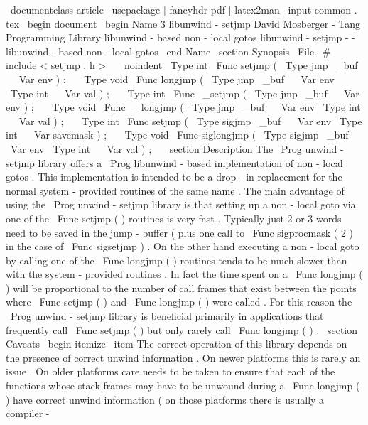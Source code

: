 \
documentclass
{
article
}
\
usepackage
[
fancyhdr
pdf
]
{
latex2man
}
\
input
{
common
.
tex
}
\
begin
{
document
}
\
begin
{
Name
}
{
3
}
{
libunwind
-
setjmp
}
{
David
Mosberger
-
Tang
}
{
Programming
Library
}
{
libunwind
-
based
non
-
local
gotos
}
libunwind
-
setjmp
-
-
libunwind
-
based
non
-
local
gotos
\
end
{
Name
}
\
section
{
Synopsis
}
\
File
{
\
#
include
<
setjmp
.
h
>
}
\
\
\
noindent
\
Type
{
int
}
\
Func
{
setjmp
}
(
\
Type
{
jmp
\
_buf
}
~
\
Var
{
env
}
)
;
\
\
\
Type
{
void
}
\
Func
{
longjmp
}
(
\
Type
{
jmp
\
_buf
}
~
\
Var
{
env
}
\
Type
{
int
}
~
\
Var
{
val
}
)
;
\
\
\
Type
{
int
}
\
Func
{
\
_setjmp
}
(
\
Type
{
jmp
\
_buf
}
~
\
Var
{
env
}
)
;
\
\
\
Type
{
void
}
\
Func
{
\
_longjmp
}
(
\
Type
{
jmp
\
_buf
}
~
\
Var
{
env
}
\
Type
{
int
}
~
\
Var
{
val
}
)
;
\
\
\
Type
{
int
}
\
Func
{
setjmp
}
(
\
Type
{
sigjmp
\
_buf
}
~
\
Var
{
env
}
\
Type
{
int
}
~
\
Var
{
savemask
}
)
;
\
\
\
Type
{
void
}
\
Func
{
siglongjmp
}
(
\
Type
{
sigjmp
\
_buf
}
~
\
Var
{
env
}
\
Type
{
int
}
~
\
Var
{
val
}
)
;
\
\
\
section
{
Description
}
The
\
Prog
{
unwind
-
setjmp
}
library
offers
a
\
Prog
{
libunwind
}
-
based
implementation
of
non
-
local
gotos
.
This
implementation
is
intended
to
be
a
drop
-
in
replacement
for
the
normal
system
-
provided
routines
of
the
same
name
.
The
main
advantage
of
using
the
\
Prog
{
unwind
-
setjmp
}
library
is
that
setting
up
a
non
-
local
goto
via
one
of
the
\
Func
{
setjmp
}
(
)
routines
is
very
fast
.
Typically
just
2
or
3
words
need
to
be
saved
in
the
jump
-
buffer
(
plus
one
call
to
\
Func
{
sigprocmask
}
(
2
)
in
the
case
of
\
Func
{
sigsetjmp
}
)
.
On
the
other
hand
executing
a
non
-
local
goto
by
calling
one
of
the
\
Func
{
longjmp
}
(
)
routines
tends
to
be
much
slower
than
with
the
system
-
provided
routines
.
In
fact
the
time
spent
on
a
\
Func
{
longjmp
}
(
)
will
be
proportional
to
the
number
of
call
frames
that
exist
between
the
points
where
\
Func
{
setjmp
}
(
)
and
\
Func
{
longjmp
}
(
)
were
called
.
For
this
reason
the
\
Prog
{
unwind
-
setjmp
}
library
is
beneficial
primarily
in
applications
that
frequently
call
\
Func
{
setjmp
}
(
)
but
only
rarely
call
\
Func
{
longjmp
}
(
)
.
\
section
{
Caveats
}
\
begin
{
itemize
}
\
item
The
correct
operation
of
this
library
depends
on
the
presence
of
correct
unwind
information
.
On
newer
platforms
this
is
rarely
an
issue
.
On
older
platforms
care
needs
to
be
taken
to
ensure
that
each
of
the
functions
whose
stack
frames
may
have
to
be
unwound
during
a
\
Func
{
longjmp
}
(
)
have
correct
unwind
information
(
on
those
platforms
there
is
usually
a
compiler
-
